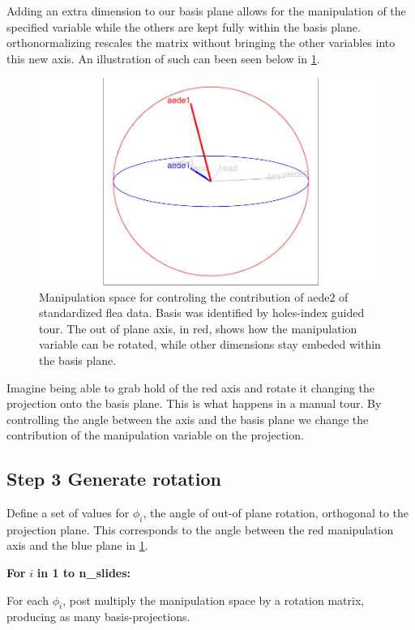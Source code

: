 \documentclass{monashthesis}
\begin{document}
Adding an extra dimension to our basis plane allows for the manipulation
of the specified variable while the others are kept fully within the
basis plane. orthonormalizing rescales the matrix without bringing the
other variables into this new axis. An illustration of such can been
seen below in \ref{fig:step2}.

\begin{figure}
\centering
\includegraphics{thesis_files/figure-latex/step2-1.pdf}
\caption{\label{fig:step2}Manipulation space for controling the contribution
of aede2 of standardized flea data. Basis was identified by holes-index
guided tour. The out of plane axis, in red, shows how the manipulation
variable can be rotated, while other dimensions stay embeded within the
basis plane.}
\end{figure}

Imagine being able to grab hold of the red axis and rotate it changing
the projection onto the basis plane. This is what happens in a manual
tour. By controlling the angle between the axis and the basis plane we
change the contribution of the manipulation variable on the projection.

\subsection{Step 3 Generate rotation}\label{step-3-generate-rotation}

Define a set of values for \(\phi_i\), the angle of out-of plane
rotation, orthogonal to the projection plane. This corresponds to the
angle between the red manipulation axis and the blue plane in
\ref{fig:step2}.

\textbf{For } \(i\) \textbf{in 1 to n\_slides:}

For each \(\phi_i\), post multiply the manipulation space by a rotation
matrix, producing as many basis-projections.
\end{document}
